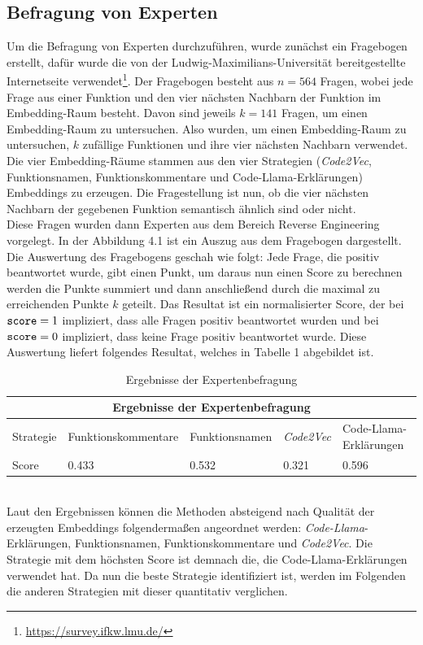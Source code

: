 \documentclass[12pt,letterpaper,ngerman]{article}
\begin{document}
\subsection{Befragung von Experten}
Um die Befragung von Experten durchzuführen, wurde zunächst ein
Fragebogen erstellt, dafür wurde die von der 
Ludwig-Maximilians-Universität bereitgestellte Internetseite
verwendet\footnote{\url{https://survey.ifkw.lmu.de/}}. Der 
Fragebogen besteht aus $n=564 $ Fragen, wobei jede Frage aus
einer Funktion und den vier nächsten Nachbarn der Funktion im
Embedding-Raum besteht. Davon sind jeweils $k = 141$ Fragen, um
einen Embedding-Raum zu untersuchen. Also wurden, um einen
Embedding-Raum zu untersuchen, $k$ zufällige Funktionen und ihre
vier nächsten Nachbarn verwendet. Die vier Embedding-Räume
stammen aus den vier Strategien (\textit{Code2Vec}, Funktionsnamen,
Funktionskommentare und Code-Llama-Erklärungen) Embeddings zu 
erzeugen. Die Fragestellung ist nun, ob die vier nächsten Nachbarn 
der gegebenen Funktion semantisch ähnlich sind oder nicht.\\
Diese Fragen wurden dann Experten aus dem Bereich Reverse Engineering
vorgelegt. In der Abbildung 4.1 ist ein Auszug aus dem Fragebogen dargestellt.\\
Die Auswertung des Fragebogens geschah wie folgt: Jede Frage,
die positiv beantwortet wurde, gibt einen Punkt, um daraus nun 
einen Score zu berechnen werden die Punkte
summiert und dann anschließend durch die  maximal zu
erreichenden Punkte $k$ geteilt. Das Resultat ist ein normalisierter 
Score, der bei $\verb|score| = 1$ impliziert, dass alle Fragen 
positiv beantwortet wurden und bei $\verb|score| = 0$ impliziert, 
dass keine Frage positiv beantwortet wurde. Diese 
Auswertung liefert folgendes Resultat, welches in Tabelle 1
abgebildet ist.
\begin{table}
  \begin{center}
    \begin{tabular}{ |p{1.3cm}||p{3.8cm}|p{3cm}|p{1.8cm}|p{4.5cm}|  }
    \hline
    \multicolumn{5}{|c|}{Ergebnisse der Expertenbefragung} \\
    \hline
    Strategie & Funktionskommentare &  Funktionsnamen & \textit{Code2Vec} & Code-Llama-Erklärungen\\
    \hline
    Score   & 0.433 & 0.532 & 0.321 & 0.596 \\
    \hline
    \end{tabular}
  \end{center} 
  \caption{Ergebnisse der Expertenbefragung}
\end{table}
\hfill\\
Laut den Ergebnissen können die Methoden absteigend 
nach Qualität der erzeugten Embeddings folgendermaßen
angeordnet werden: \textit{Code-Llama}-Erklärungen, 
Funktionsnamen, Funktionskommentare und \textit{Code2Vec}.
Die Strategie mit dem höchsten Score ist demnach die,
die Code-Llama-Erklärungen
verwendet hat. Da nun die beste Strategie identifiziert ist, 
werden im Folgenden die anderen Strategien mit dieser quantitativ verglichen.
\pagebreak
\end{document}
